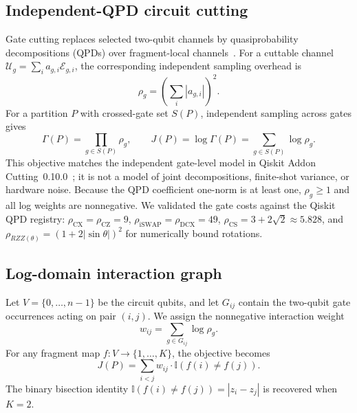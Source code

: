 \documentclass[
  aps,
  pra,
  reprint,
  amsmath,
  amssymb,
  longbibliography,
  nofootinbib,
  floatfix
]{revtex4-2}
\theoremstyle{plain}
\begin{document}
\subsection{Independent-QPD circuit cutting}

Gate cutting replaces selected two-qubit channels by quasiprobability decompositions (QPDs) over fragment-local channels~\cite{peng2020,mitarai2021}. For a cuttable channel $\mathcal{U}_g=\sum_i a_{g,i}\mathcal{E}_{g,i}$, the corresponding independent sampling overhead is
\begin{equation}
  \rho_g = \left(\sum_i |a_{g,i}|\right)^{\!2}.
  \label{eq:gate-overhead}
\end{equation}
For a partition $P$ with crossed-gate set $S(P)$, independent sampling across gates gives
\begin{equation}
  \Gamma(P) = \prod_{g \in S(P)} \rho_g, \qquad
  J(P) = \log \Gamma(P) = \sum_{g \in S(P)} \log \rho_g.
  \label{eq:objective}
\end{equation}
This objective matches the independent gate-level model in Qiskit Addon Cutting~0.10.0~\cite{qiskitcutting}; it is not a model of joint decompositions, finite-shot variance, or hardware noise. Because the QPD coefficient one-norm is at least one, $\rho_g\geq1$ and all log weights are nonnegative. We validated the gate costs against the Qiskit QPD registry: $\rho_{\mathrm{CX}}=\rho_{\mathrm{CZ}}=9$, $\rho_{\mathrm{iSWAP}}=\rho_{\mathrm{DCX}}=49$, $\rho_{\mathrm{CS}}=3+2\sqrt{2}\approx5.828$, and $\rho_{RZZ(\theta)}=(1+2|\sin\theta|)^2$ for numerically bound rotations.

\subsection{Log-domain interaction graph}

Let $V=\{0,\ldots,n{-}1\}$ be the circuit qubits, and let $G_{ij}$ contain the two-qubit gate occurrences acting on pair $(i,j)$. We assign the nonnegative interaction weight
\begin{equation}
  w_{ij} = \sum_{g \in G_{ij}} \log \rho_g.
  \label{eq:weight}
\end{equation}
For any fragment map $f:V\rightarrow\{1,\ldots,K\}$, the objective becomes
\begin{equation}
  J(P) = \sum_{i < j} w_{ij} \cdot \mathbb{I}(f(i)\neq f(j)).
  \label{eq:graph-objective}
\end{equation}
The binary bisection identity $\mathbb{I}(f(i)\neq f(j))=|z_i-z_j|$ is recovered when $K=2$.
\end{document}
